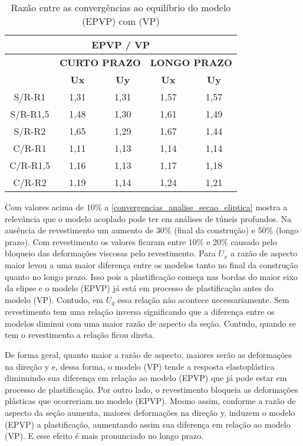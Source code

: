 \begin{table}[H]
	\caption{Razão entre as convergências ao equilíbrio do modelo (EPVP) com (VP)}
	\label{convergencias_analise_secao_eliptica}
	\centering
	\small
	\renewcommand{\arraystretch}{1.25}
	\begin{tabular}{c c c c c}
		\hline
		\multicolumn{5}{c}{\textbf{EPVP / VP}}\\	
		\hline
		\multicolumn{1}{c}{} &
		\multicolumn{2}{c}{\textbf{CURTO PRAZO}} &
		\multicolumn{2}{c}{\textbf{LONGO PRAZO}}	\\
		\multicolumn{1}{c}{} &
		\multicolumn{1}{c}{\textbf{Ux}} &
		\multicolumn{1}{c}{\textbf{Uy}} &
		\multicolumn{1}{c}{\textbf{Ux}} &
		\multicolumn{1}{c}{\textbf{Uy}} \\
		\hline
		S/R-R1	 &	1,31 &	1,31 &	1,57 &	1,57 \\
		S/R-R1,5 &	1,48 &	1,30 &	1,61 &	1,49 \\
		S/R-R2	 &	1,65 &	1,29 &	1,67 &	1,44 \\
		C/R-R1	 &	1,11 &	1,13 &	1,14 &	1,14 \\
		C/R-R1,5 &	1,16 &	1,13 &	1,17 &	1,18 \\
		C/R-R2	 &	1,19 &	1,14 &	1,24 &	1,21 \\
		\hline
	\end{tabular}
	\normalsize
\end{table}
Com valores acima de 10\% a \autoref{convergencias_analise_secao_eliptica} mostra a relevância que o modelo acoplado pode ter em análises de túneis profundos. Na ausência de revestimento um aumento de 30\% (final da construção) e 50\% (longo prazo). Com revestimento os valores ficaram entre 10\% e 20\% causado pelo bloqueio das deformações viscosas pelo revestimento. Para $U_x$ a razão de aspecto maior levou a uma maior diferença entre os modelos tanto no final da construção quanto no longo prazo. Isso pois a plastificação começa nas bordas do maior eixo da elipse e o modelo (EPVP) já está em processo de plastificação antes do modelo (VP). Contudo, em $U_y$ essa relação não acontece necessariamente. Sem revestimento tem uma relação inversa significando que a diferença entre os modelos diminui com uma maior razão de aspecto da seção. Contudo, quando se tem o revestimento a relação ficou direta.

De forma geral, quanto maior a razão de aspecto, maiores serão as deformações na direção y e, dessa forma, o modelo (VP) tende a resposta elastoplástica diminuindo sua diferença em relação ao modelo (EPVP) que já pode estar em processo de plastificação. Por outro lado, o revestimento bloqueia as deformações plásticas que ocorreriam no modelo (EPVP). Mesmo assim, conforme a razão de aspecto da seção aumenta, maiores deformações na direção y, induzem o modelo (EPVP) a plastificação, aumentando assim sua diferença em relação ao modelo (VP). E esse efeito é mais pronunciado no longo prazo.

